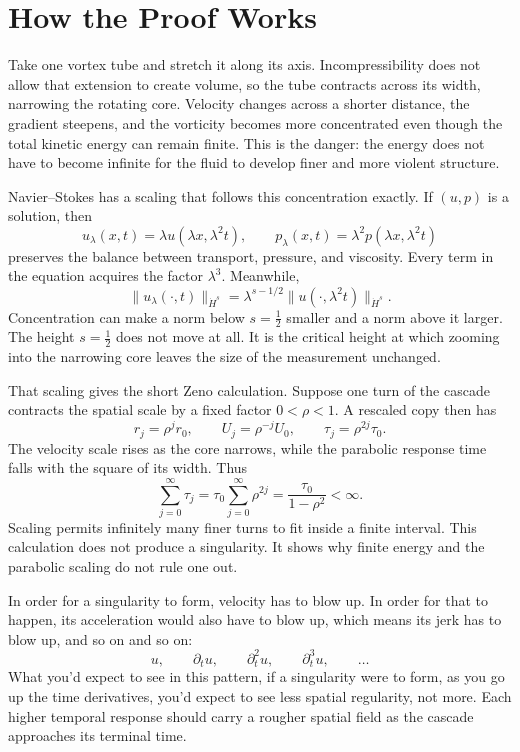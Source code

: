 \section*{How the Proof Works}

Take one vortex tube and stretch it along its axis. Incompressibility does not
allow that extension to create volume, so the tube contracts across its width,
narrowing the rotating core. Velocity changes across a shorter distance, the
gradient steepens, and the vorticity becomes more concentrated even though the
total kinetic energy can remain finite. This is the danger: the energy does not
have to become infinite for the fluid to develop finer and more violent
structure.

Navier--Stokes has a scaling that follows this concentration exactly. If
\((u,p)\) is a solution, then
\[
u_\lambda(x,t)=\lambda u(\lambda x,\lambda^2t),
\qquad
p_\lambda(x,t)=\lambda^2p(\lambda x,\lambda^2t)
\]
preserves the balance between transport, pressure, and viscosity. Every term in
the equation acquires the factor \(\lambda^3\). Meanwhile,
\[
\|u_\lambda(\cdot,t)\|_{\dot H^s}
=\lambda^{s-1/2}
  \|u(\cdot,\lambda^2t)\|_{\dot H^s}.
\]
Concentration can make a norm below \(s=\tfrac12\) smaller and a norm above it
larger. The height \(s=\tfrac12\) does not move at all. It is the critical
height at which zooming into the narrowing core leaves the size of the
measurement unchanged.

That scaling gives the short Zeno calculation. Suppose one turn of the cascade
contracts the spatial scale by a fixed factor \(0<\rho<1\). A rescaled copy then
has
\[
r_j=\rho^j r_0,
\qquad
U_j=\rho^{-j}U_0,
\qquad
\tau_j=\rho^{2j}\tau_0.
\]
The velocity scale rises as the core narrows, while the parabolic response time
falls with the square of its width. Thus
\[
\sum_{j=0}^{\infty}\tau_j
=\tau_0\sum_{j=0}^{\infty}\rho^{2j}
=\frac{\tau_0}{1-\rho^2}<\infty.
\]
Scaling permits infinitely many finer turns to fit inside a finite interval.
This calculation does not produce a singularity. It shows why finite energy
and the parabolic scaling do not rule one out.

In order for a singularity to form, velocity has to blow up. In order for that
to happen, its acceleration would also have to blow up, which means its jerk
has to blow up, and so on and so on:
\[
u,\qquad
\partial_tu,\qquad
\partial_t^2u,\qquad
\partial_t^3u,\qquad\ldots
\]
What you'd expect to see in this pattern, if a singularity were to form, as
you go up the time derivatives, you'd expect to see less spatial regularity,
not more. Each higher temporal response should carry a rougher spatial field
as the cascade approaches its terminal time.

